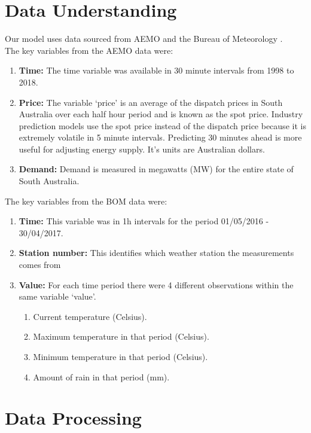 \documentclass[11pt]{article}
\begin{document}
\section{Data Understanding}
\label{section: data_processing}
Our model uses data sourced from AEMO \citep{noauthor_data_2018} and the Bureau of Meteorology \citep{noauthor_historical_2017}.\\ The key variables from the AEMO data were:
\begin{enumerate}
\item \textbf{Time:} The time variable was available in 30 minute intervals from 1998 to 2018. 
\item \textbf{Price:} The variable `price' is an average of the dispatch prices in South Australia over each half hour period and is known as the spot price. Industry prediction models use the spot price instead of the dispatch price because it is extremely volatile in 5 minute intervals. Predicting 30 minutes ahead is more useful for adjusting energy supply. It's units are Australian dollars. 
\item \textbf{Demand:} Demand is measured in megawatts (MW) for the entire state of South Australia.
\end{enumerate}


\noindent The key variables from the BOM data were:
\begin{enumerate}
\item \textbf{Time:} This variable was in 1h intervals for the period  01/05/2016 - 30/04/2017.
\item \textbf{Station number:} This identifies which weather station the measurements comes from
\item \textbf{Value:} For each time period there were 4  different observations within the same variable `value'.
\begin{enumerate}
\item Current temperature (Celsius). 
\item Maximum temperature in that period (Celsius).
\item Minimum temperature in that period (Celsius).
\item Amount of rain in that period (mm).
\end{enumerate}
\end{enumerate}
    

\section{Data Processing}
\end{document}
